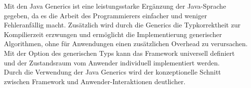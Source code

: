 Mit den Java Generics ist eine leistungsstarke Ergänzung der Java-Sprache gegeben, da es die Arbeit des Programmierers einfacher und 
weniger Fehleranfällig macht. Zusätzlich wird durch die Generics die Typkorrektheit zur Kompilierzeit erzwungen und ermöglicht 
die Implementierung generischer Algorithmen, ohne für Anwendungen einen zusätzlichen Overhead zu verursachen. 
\\
Mit der Option des generischen Typs kann das Framework universell definiert und der Zustandsraum vom Anwender individuell implementiert werden.
\\
\linebreak
Durch die Verwendung der Java Generics wird der konzeptionelle Schnitt zwischen Framework und Anwender-Interaktionen deutlicher.

